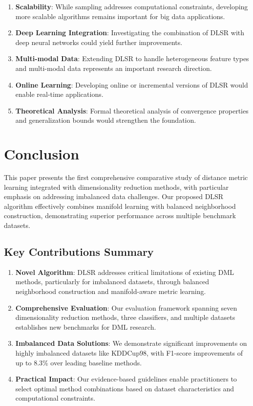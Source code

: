 \documentclass[review]{elsarticle}
\begin{document}
\begin{enumerate}
\item \textbf{Scalability}: While sampling addresses computational constraints, developing more scalable algorithms remains important for big data applications.

\item \textbf{Deep Learning Integration}: Investigating the combination of DLSR with deep neural networks could yield further improvements.

\item \textbf{Multi-modal Data}: Extending DLSR to handle heterogeneous feature types and multi-modal data represents an important research direction.

\item \textbf{Online Learning}: Developing online or incremental versions of DLSR would enable real-time applications.

\item \textbf{Theoretical Analysis}: Formal theoretical analysis of convergence properties and generalization bounds would strengthen the foundation.
\end{enumerate}

\section{Conclusion}
\label{sec:conclusion}

This paper presents the first comprehensive comparative study of distance metric learning integrated with dimensionality reduction methods, with particular emphasis on addressing imbalanced data challenges. Our proposed DLSR algorithm effectively combines manifold learning with balanced neighborhood construction, demonstrating superior performance across multiple benchmark datasets.

\subsection{Key Contributions Summary}

\begin{enumerate}
\item \textbf{Novel Algorithm}: DLSR addresses critical limitations of existing DML methods, particularly for imbalanced datasets, through balanced neighborhood construction and manifold-aware metric learning.

\item \textbf{Comprehensive Evaluation}: Our evaluation framework spanning seven dimensionality reduction methods, three classifiers, and multiple datasets establishes new benchmarks for DML research.

\item \textbf{Imbalanced Data Solutions}: We demonstrate significant improvements on highly imbalanced datasets like KDDCup98, with F1-score improvements of up to 8.3\% over leading baseline methods.

\item \textbf{Practical Impact}: Our evidence-based guidelines enable practitioners to select optimal method combinations based on dataset characteristics and computational constraints.
\end{enumerate}
\end{document}

